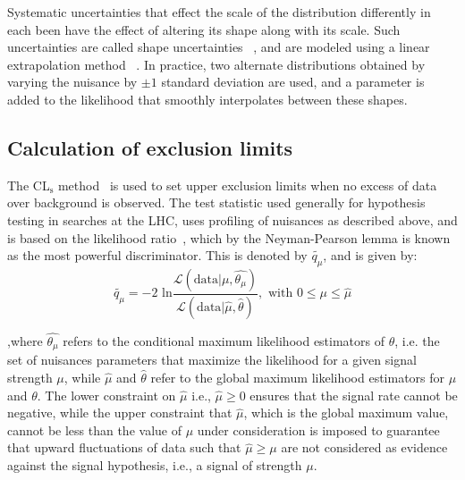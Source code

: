 Systematic uncertainties that effect the scale of the distribution differently in each been have the effect of altering its shape along with its scale. Such uncertainties are called shape uncertainties ~\cite{shape_syst1}, and are modeled using a linear extrapolation method ~\cite{shape_syst2}. In practice, two alternate distributions obtained by varying the nuisance by $\pm 1$ standard deviation are used, and a parameter is added to the likelihood that smoothly interpolates between these shapes.

\subsection{Calculation of exclusion limits}
\label{exc_cal}
The CL$_\text{s}$ method~\cite{cls1,cls2,cls3} is used to set upper exclusion limits when no excess of data over background is observed. The test statistic used generally for hypothesis testing in searches at the LHC, uses profiling of nuisances as described above, and is based on the likelihood ratio~\cite{prof_likelihood}, which by the Neyman-Pearson lemma is known as the most powerful discriminator. This is denoted by $\tilde{q_\mu}$, and is given by:
\begin{equation}
\label{eq:proflik}
  \tilde{q_\mu}=-2\text{ ln}\frac{\mathcal{L}(\text{data}|\mu,\hat{\theta_\mu})}{\mathcal{L}(\text{data}|\hat{\mu},\hat{\theta})},\text{   with  } 0\leq \mu \leq \hat{\mu} 
\end{equation}

,where $\hat{\theta_\mu}$ refers to the conditional maximum likelihood estimators of $\theta$, i.e. the set of nuisances parameters that maximize the likelihood for a given signal strength $\mu$, while $\hat\mu$ and $\hat\theta$ refer to the global maximum likelihood estimators for $\mu$ and $\theta$. The lower constraint on $\hat{\mu}$ i.e., $\hat{\mu}\geq 0$ ensures that the signal rate cannot be negative, while the upper constraint that $\hat{\mu}$, which is the global maximum value, cannot be less than the value of $\mu$ under consideration is imposed to guarantee that upward fluctuations of data such that $\hat{\mu}\geq \mu$ are not considered as evidence against the signal hypothesis, i.e., a signal of strength $\mu$.

